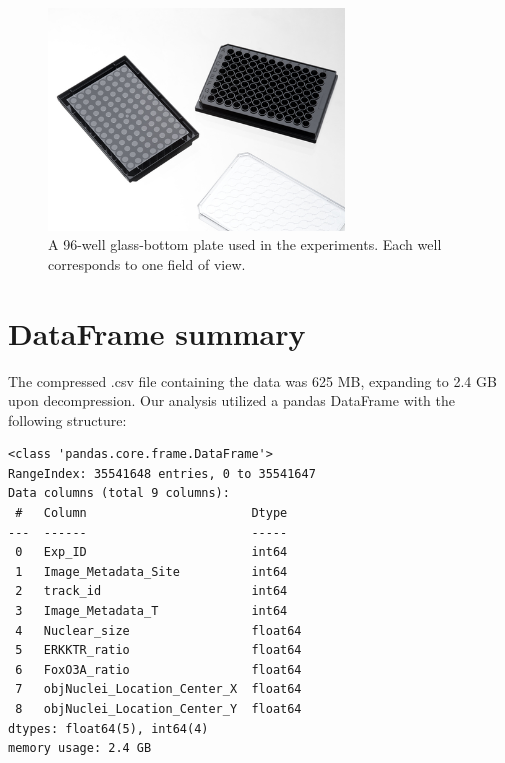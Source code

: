 \documentclass[licencjacka,en]{pracamgr}
\begin{document}
\begin{figure}[ht] \centering \includegraphics[width=0.7\textwidth]{images/glass_plates.png} \caption{A 96-well glass-bottom plate used in the experiments. Each well corresponds to one field of view.} 
\label{fig:glass_plate} \end{figure}
\section{DataFrame summary}

The compressed .csv file containing the data was 625 MB, expanding to 2.4 GB upon decompression. Our analysis utilized a pandas DataFrame with the following structure:
\begin{verbatim}
<class 'pandas.core.frame.DataFrame'>
RangeIndex: 35541648 entries, 0 to 35541647
Data columns (total 9 columns):
 #   Column                       Dtype  
---  ------                       -----  
 0   Exp_ID                       int64  
 1   Image_Metadata_Site          int64  
 2   track_id                     int64  
 3   Image_Metadata_T             int64  
 4   Nuclear_size                 float64
 5   ERKKTR_ratio                 float64
 6   FoxO3A_ratio                 float64
 7   objNuclei_Location_Center_X  float64
 8   objNuclei_Location_Center_Y  float64
dtypes: float64(5), int64(4)
memory usage: 2.4 GB
\end{verbatim}
\end{document}
